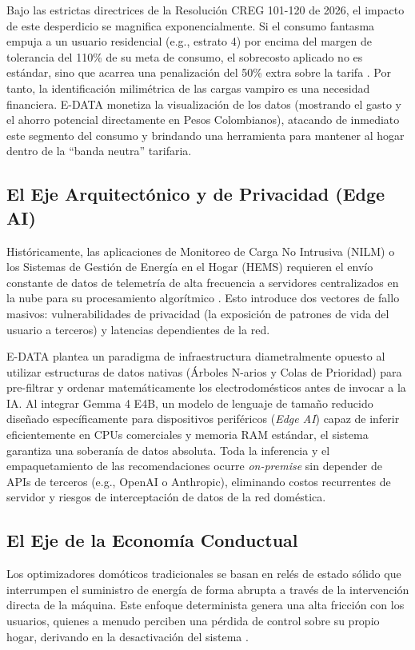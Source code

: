 \documentclass[10pt,journal,compsoc]{IEEEtran}
\begin{document}
Bajo las estrictas directrices de la Resolución CREG 101-120 de 2026, el impacto de este desperdicio se magnifica exponencialmente. Si el consumo fantasma empuja a un usuario residencial (e.g., estrato 4) por encima del margen de tolerancia del 110\% de su meta de consumo, el sobrecosto aplicado no es estándar, sino que acarrea una penalización del 50\% extra sobre la tarifa \cite{creg2026}. Por tanto, la identificación milimétrica de las cargas vampiro es una necesidad financiera. E-DATA monetiza la visualización de los datos (mostrando el gasto y el ahorro potencial directamente en Pesos Colombianos), atacando de inmediato este segmento del consumo y brindando una herramienta para mantener al hogar dentro de la ``banda neutra'' tarifaria.

\subsection{El Eje Arquitectónico y de Privacidad (Edge AI)}
Históricamente, las aplicaciones de Monitoreo de Carga No Intrusiva (NILM) o los Sistemas de Gestión de Energía en el Hogar (HEMS) requieren el envío constante de datos de telemetría de alta frecuencia a servidores centralizados en la nube para su procesamiento algorítmico \cite{xue2025}. Esto introduce dos vectores de fallo masivos: vulnerabilidades de privacidad (la exposición de patrones de vida del usuario a terceros) y latencias dependientes de la red.

E-DATA plantea un paradigma de infraestructura diametralmente opuesto al utilizar estructuras de datos nativas (Árboles N-arios y Colas de Prioridad) para pre-filtrar y ordenar matemáticamente los electrodomésticos antes de invocar a la IA. Al integrar Gemma 4 E4B, un modelo de lenguaje de tamaño reducido diseñado específicamente para dispositivos periféricos (\emph{Edge AI}) capaz de inferir eficientemente en CPUs comerciales y memoria RAM estándar, el sistema garantiza una soberanía de datos absoluta. Toda la inferencia y el empaquetamiento de las recomendaciones ocurre \emph{on-premise} sin depender de APIs de terceros (e.g., OpenAI o Anthropic), eliminando costos recurrentes de servidor y riesgos de interceptación de datos de la red doméstica.

\subsection{El Eje de la Economía Conductual}
Los optimizadores domóticos tradicionales se basan en relés de estado sólido que interrumpen el suministro de energía de forma abrupta a través de la intervención directa de la máquina. Este enfoque determinista genera una alta fricción con los usuarios, quienes a menudo perciben una pérdida de control sobre su propio hogar, derivando en la desactivación del sistema \cite{xue2025}.
\end{document}
